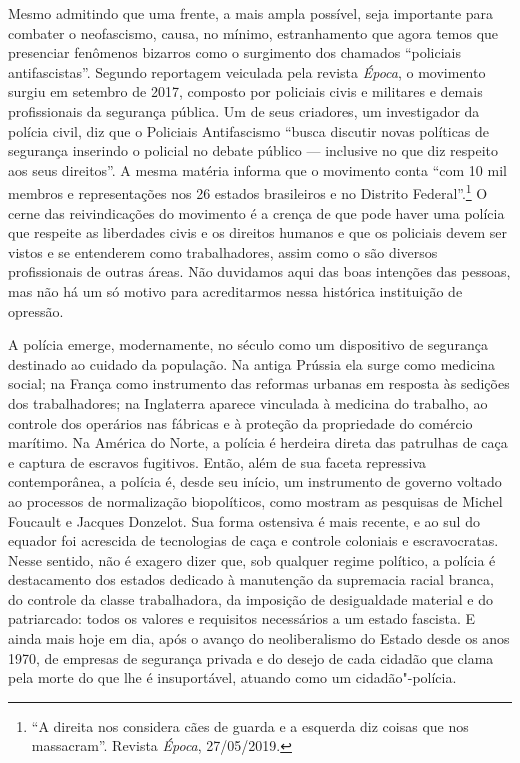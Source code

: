 Mesmo admitindo que uma frente, a mais ampla possível, seja importante para combater o neofascismo, causa, no mínimo, estranhamento que agora temos que presenciar fenômenos bizarros como o surgimento dos chamados ``policiais antifascistas''. Segundo reportagem veiculada pela revista \emph{Época}, o movimento surgiu em setembro de 2017, composto por policiais civis e militares e demais profissionais da segurança pública. Um de seus criadores, um investigador da polícia civil, diz que o Policiais Antifascismo ``busca discutir novas políticas de segurança inserindo o policial no debate público — inclusive no que diz respeito aos seus direitos''. A mesma matéria informa que o movimento conta ``com 10 mil membros e representações nos 26 estados brasileiros e no Distrito Federal''.\footnote{``A direita nos considera cães de guarda e a esquerda diz coisas que nos massacram''. Revista \emph{Época}, 27/05/2019.} O cerne das reivindicações do movimento é a crença de que pode haver uma polícia que respeite as liberdades civis e os direitos humanos e que os policiais devem ser vistos e se entenderem como trabalhadores, assim como o são diversos profissionais de outras áreas. Não duvidamos aqui das boas intenções das pessoas, mas não há um só motivo para acreditarmos nessa histórica instituição de opressão.

A polícia emerge, modernamente, no século  como um dispositivo de segurança destinado ao cuidado da população. Na antiga Prússia ela surge como medicina social; na França como instrumento das reformas urbanas em resposta às sedições dos trabalhadores; na Inglaterra aparece vinculada à medicina do trabalho, ao controle dos operários nas fábricas e à proteção da propriedade do comércio marítimo. Na América do Norte, a polícia é herdeira direta das patrulhas de caça e captura de escravos fugitivos. Então, além de sua faceta repressiva contemporânea, a polícia é, desde seu início, um instrumento de governo voltado ao processos de normalização biopolíticos, como mostram as pesquisas de Michel Foucault e Jacques Donzelot. Sua forma ostensiva é mais recente, e ao sul do equador foi acrescida de tecnologias de caça e controle coloniais e escravocratas. Nesse sentido, não é exagero dizer que, sob qualquer regime político, a polícia é destacamento dos estados dedicado à manutenção da supremacia racial branca, do controle da classe trabalhadora, da imposição de desigualdade material e do patriarcado: todos os valores e requisitos necessários a um estado fascista. E ainda mais hoje em dia, após o avanço do neoliberalismo do Estado desde os anos 1970, de empresas de segurança privada e do desejo de cada cidadão que clama pela morte do que lhe é insuportável, atuando como um cidadão"-polícia.

